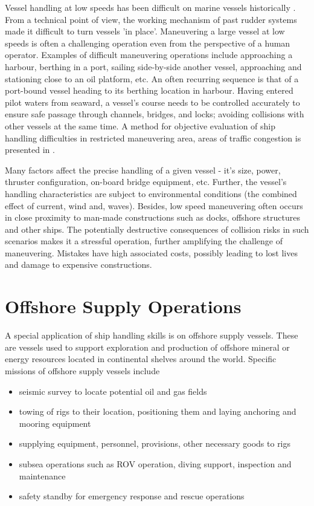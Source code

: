 Vessel handling at low speeds has been difficult on marine vessels historically \parencite{brittanica:ship}. From a technical point of view, the working mechanism of past rudder systems made it difficult to turn vessels 'in place'. Maneuvering a large vessel at low speeds is often a challenging operation even from the perspective of a human operator. Examples of difficult maneuvering operations include approaching a harbour, berthing in a port, sailing side-by-side another vessel, approaching and stationing close to an oil platform, etc. An often recurring sequence is that of a port-bound vessel heading to its berthing location in harbour. Having entered pilot waters from seaward, a vessel's course needs to be controlled accurately to ensure safe passage through channels, bridges, and locks; avoiding collisions with other vessels at the same time. A method for objective evaluation of ship handling difficulties in restricted maneuvering area, areas of traffic congestion is presented in \parencite{inoue2000evaluation}.

Many factors affect the precise handling of a given vessel - it's size, power, thruster configuration, on-board bridge equipment, etc. Further, the vessel's handling characteristics are subject to environmental conditions (the combined effect of current, wind and, waves). Besides, low speed maneuvering often occurs in close proximity to man-made constructions such as docks, offshore structures and other ships. The potentially destructive consequences of collision risks in such scenarios makes it a stressful operation, further amplifying the challenge of maneuvering. Mistakes have high associated costs, possibly leading to lost lives and damage to expensive constructions.

\section{Offshore Supply Operations}

A special application of ship handling skills is on offshore supply vessels. These are vessels used to support exploration and production of offshore mineral or energy resources located in continental shelves around the world. Specific missions of offshore supply vessels include 

\begin{itemize}\renewcommand{\labelitemi}{\tiny$\blacksquare$} 
\item seismic survey to locate potential oil and gas fields
\item towing of rigs to their location, positioning them and laying anchoring and mooring equipment
\item supplying equipment, personnel, provisions, other necessary goods to rigs
\item subsea operations such as ROV operation, diving support, inspection and maintenance
\item safety standby for emergency response and rescue operations
\end{itemize}

